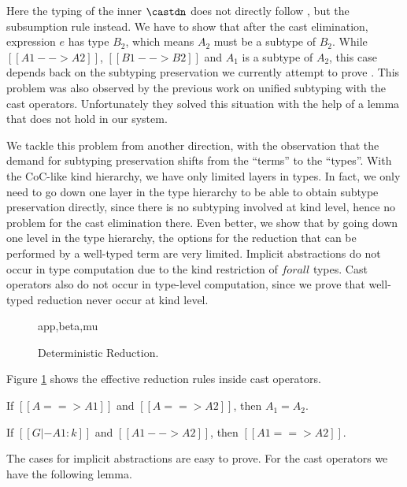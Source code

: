Here the typing of the inner $\castdn$ does not directly follow
, but the subsumption rule instead. We have to show that after
the cast elimination, expression $e$ has type $B_2$, which means $A_2$ must be
a subtype of $B_2$. While $[[A1 --> A2]]$, $[[B1 --> B2]]$ and $A_1$ is a subtype
of $A_2$, this case depends back on the subtyping preservation we currently attempt to prove
.
This problem was also observed by the previous work on unified subtyping
with the cast operators\cite{yang2017unifying}. Unfortunately they solved this
situation with the help of a lemma that does not hold in our system.

We tackle this problem from another direction, with the observation that the
demand for subtyping preservation shifts from the ``terms'' to the ``types''.
With the CoC-like kind hierarchy, we have only limited layers in types.
In fact, we only need to go down one layer in the type hierarchy to be able to
obtain subtype preservation directly, since there is no subtyping involved at kind level,
hence no problem for the cast elimination there.
Even better, we show that by going down one level in the type hierarchy, the options
for the reduction that can be performed by a well-typed term are very limited.
Implicit abstractions do not occur in type computation due to the kind
restriction of $forall$ types. Cast operators also do not occur in type-level computation,
since we prove that well-typed reduction never occur at kind level.

\begin{figure}
      {app,beta,mu}
    \caption{Deterministic Reduction.}
    \label{fig:deterministic-reduction}
\end{figure}

Figure \ref{fig:deterministic-reduction} shows the effective reduction rules
inside cast operators.

\begin{lemma}
    If $[[A ==> A1]]$ and $[[A ==> A2]]$,
    then $A_1 = A_2$.
\end{lemma}

\begin{lemma}
    If $[[G |- A1 : k]]$ and $[[A1 --> A2]]$,
    then $[[A1 ==> A2]]$.
\end{lemma}

The cases for implicit abstractions are easy to prove. For the cast operators
we have the following lemma.

